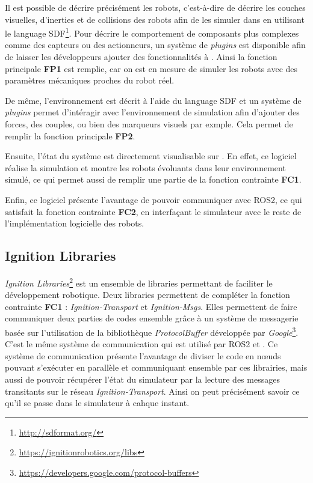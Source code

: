             Il est possible de décrire précisément les robots, c'est-à-dire de décrire les couches visuelles, d'inerties et de collisions des robots afin de les simuler dans \gazebo{} en utilisant le language \gls{SDF}\footnote{\url{http://sdformat.org/}}. Pour décrire le comportement de composants plus complexes comme des capteurs ou des actionneurs, un système de \textit{plugins} est disponible afin de laisser les développeurs ajouter des fonctionnalités à \gazebo{}. Ainsi la fonction principale \textbf{FP1} est remplie, car on est en mesure de simuler les robots avec des paramètres mécaniques proches du robot réel.

            De même, l'environnement est décrit à l'aide du language \gls{SDF} et un système de \textit{plugins} permet d'intéragir avec l'environnement de simulation afin d'ajouter des forces, des couples, ou bien des marqueurs visuels par exmple. Cela permet de remplir la fonction principale \textbf{FP2}.

            Ensuite, l'état du système est directement visualisable sur \gazebo{}. En effet, ce logiciel réalise la simulation et montre les robots évoluants dans leur environnement simulé, ce qui permet aussi de remplir une partie de la fonction contrainte \textbf{FC1}.

            Enfin, ce logiciel présente l'avantage de pouvoir communiquer avec \gls{ROS2}, ce qui satisfait la fonction contrainte \textbf{FC2}, en interfaçant le simulateur avec le reste de l'implémentation logicielle des robots.

        \subsection{Ignition Libraries}

            \textit{Ignition Libraries}\footnote{\url{https://ignitionrobotics.org/libs}} est un ensemble de libraries permettant de faciliter le développement robotique. Deux libraries permettent de compléter la fonction contrainte \textbf{FC1} : \textit{Ignition-Transport} et \textit{Ignition-Msgs}. Elles permettent de faire communiquer deux parties de codes ensemble grâce à un système de messagerie basée sur l'utilisation de la bibliothèque \textit{ProtocolBuffer} développée par \textit{Google}\footnote{\url{https://developers.google.com/protocol-buffers}}. C'est le même système de communication qui est utilisé par \gls{ROS2} et \gazebo{}. Ce système de communication présente l'avantage de diviser le code en n\oe uds pouvant s'exécuter en parallèle et communiquant ensemble par ces librairies, mais aussi de pouvoir récupérer l'état du simulateur par la lecture des messages transitants sur le réseau \textit{Ignition-Transport}. Ainsi on peut précisément savoir ce qu'il se passe dans le simulateur à cahque instant.

